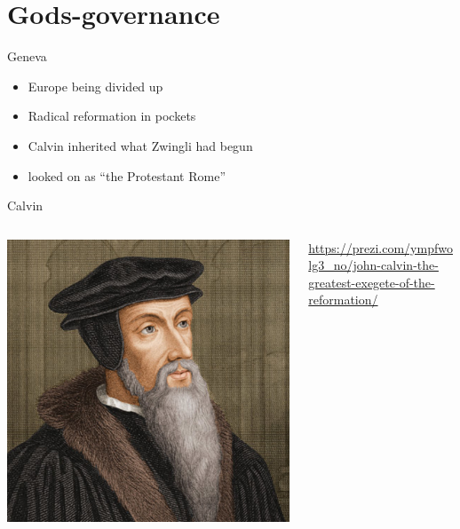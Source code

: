 \section{Gods-governance}
\label{sec-2}
\begin{frame}[label=sec-2-1]{Geneva}
\begin{itemize}[<+->]
\item Europe being divided up
\item Radical reformation in pockets
\item Calvin inherited what Zwingli had begun
\item looked on as ``the Protestant Rome''
\end{itemize}
\end{frame}

\begin{frame}[label=sec-2-2]{Calvin}
\begin{columns}
\begin{column}{.5\textwidth}
\includegraphics[width=.9\linewidth]{./img/john-calvin.jpg}
\end{column}

\begin{column}{.5\textwidth}
\url{https://prezi.com/ympfwolg3_no/john-calvin-the-greatest-exegete-of-the-reformation/}
\end{column}
\end{columns}
\end{frame}

